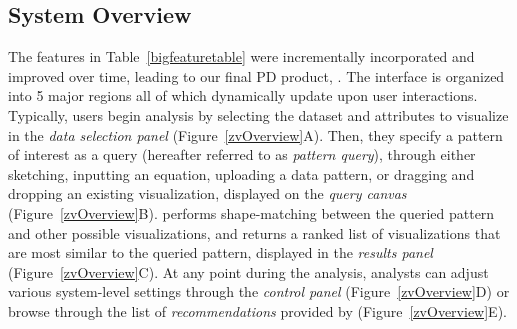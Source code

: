 \subsection{System Overview\label{sec:system}}%
The features in Table~\ref{bigfeaturetable} were incrementally incorporated and improved over time, leading to our final PD product, \zvpp. The \zvpp interface is organized into 5 major regions all of which dynamically update upon user interactions. Typically, users begin analysis by selecting the dataset and attributes to visualize in the \emph{data selection panel} (Figure~\ref{zvOverview}A). Then, they specify a pattern of interest as a query (hereafter referred to as \emph{pattern query}), through either sketching, inputting an equation, uploading a data pattern, or dragging and dropping an existing visualization, displayed on the \emph{query canvas} (Figure~\ref{zvOverview}B). \zvpp performs shape-matching between the queried pattern and other possible visualizations, and returns a ranked list of visualizations that are most similar to the queried pattern, displayed in the \emph{results panel} (Figure~\ref{zvOverview}C). At any point during the analysis, analysts can adjust various system-level settings through the \emph{control panel} (Figure~\ref{zvOverview}D) or browse through the list of \emph{recommendations} provided by \zvpp (Figure~\ref{zvOverview}E).  
